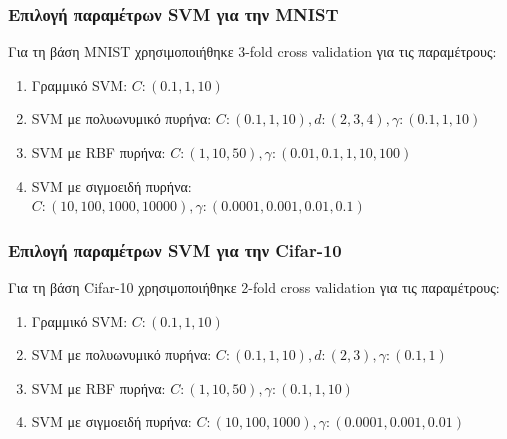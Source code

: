 \documentclass{beamer}
\begin{document}
\begin{frame}
\frametitle{Επιλογή παραμέτρων SVM για την MNIST}

Για τη βάση MNIST χρησιμοποιήθηκε 3-fold cross validation για τις παραμέτρους:

\begin{enumerate}
    \item Γραμμικό SVM: $C: (0.1, 1, 10)$
    \item SVM με πολυωνυμικό πυρήνα: $C: (0.1, 1, 10), d: (2, 3, 4), \gamma:
        (0.1, 1, 10)$
    \item SVM με RBF πυρήνα: $C: (1, 10, 50), \gamma: (0.01, 0.1, 1, 10, 100)$
    \item SVM με σιγμοειδή πυρήνα: $C: (10, 100, 1000, 10000), \gamma: (0.0001,
        0.001, 0.01, 0.1)$
\end{enumerate}

\end{frame}

\begin{frame}
\frametitle{Επιλογή παραμέτρων SVM για την Cifar-10}

Για τη βάση Cifar-10 χρησιμοποιήθηκε 2-fold cross validation για τις
παραμέτρους:

\begin{enumerate}
    \item Γραμμικό SVM: $C: (0.1, 1, 10)$
    \item SVM με πολυωνυμικό πυρήνα: $C: (0.1, 1, 10), d: (2, 3), \gamma:
        (0.1, 1)$
    \item SVM με RBF πυρήνα: $C: (1, 10, 50), \gamma: (0.1, 1, 10)$
    \item SVM με σιγμοειδή πυρήνα: $C: (10, 100, 1000), \gamma: (0.0001, 0.001,
        0.01)$
\end{enumerate}

\end{frame}
\end{document}
